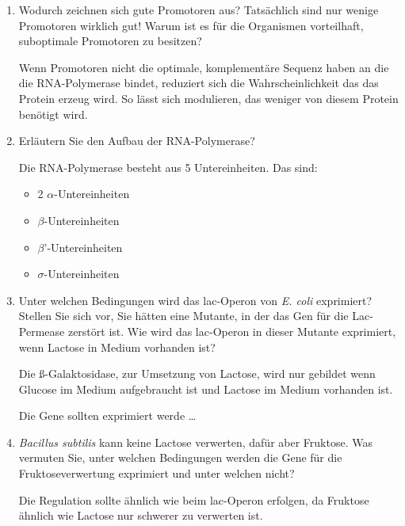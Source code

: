 \begin{enumerate}
	\item Wodurch zeichnen sich gute Promotoren aus? Tatsächlich sind nur wenige Promotoren wirklich gut! Warum ist es für die Organismen vorteilhaft, suboptimale Promotoren zu besitzen? 

		Wenn Promotoren nicht die optimale, komplementäre Sequenz haben an die die RNA-Polymerase bindet,
		reduziert sich die Wahrscheinlichkeit das das Protein erzeug wird.
		So lässt sich modulieren,
		das weniger von diesem Protein benötigt wird.

	\item Erläutern Sie den Aufbau der RNA-Polymerase?	

		Die RNA-Polymerase besteht aus 5 Untereinheiten.
		Das sind:
		\begin{itemize}
			\item 2 \begin{math}\alpha\end{math}-Untereinheiten
			\item \begin{math}\beta\end{math}-Untereinheiten
			\item \begin{math}\beta\end{math}'-Untereinheiten
			\item \begin{math}\sigma\end{math}-Untereinheiten
		\end{itemize}

	\item Unter welchen Bedingungen wird das lac-Operon von \emph{E. coli} exprimiert? Stellen Sie sich vor, Sie hätten eine Mutante, in der das Gen für die Lac-Permease zerstört ist. Wie wird das lac-Operon in dieser Mutante exprimiert, wenn Lactose in Medium vorhanden ist?
	
		Die ß-Galaktosidase, zur Umsetzung von  Lactose,
		wird nur gebildet wenn Glucose im Medium aufgebraucht ist und 
		Lactose im Medium vorhanden ist.
		
		Die Gene sollten exprimiert werde \ldots	
		
	\item \emph{Bacillus subtilis} kann keine Lactose verwerten, dafür aber Fruktose. Was vermuten Sie, unter welchen Bedingungen werden die Gene für die Fruktoseverwertung exprimiert und unter welchen nicht?	

		Die Regulation sollte ähnlich wie beim lac-Operon erfolgen,
		da Fruktose ähnlich wie Lactose nur schwerer zu verwerten ist.


\end{enumerate}
